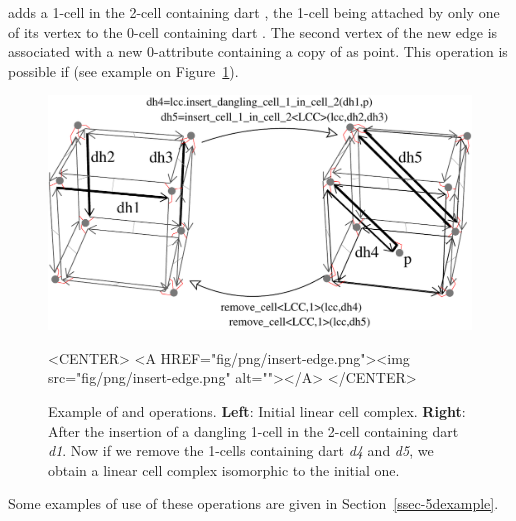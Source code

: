  adds a 1-cell in
the 2-cell containing dart , the 1-cell being attached by only
one of its vertex to the 0-cell containing dart .  The second
vertex of the new edge is associated with a new 0-attribute containing
a copy of  as point. This operation is possible if
\myin{} (see example on
Figure~\ref{fig-lcc-insert-dangling-edge}).
  \begin{figure}[htb]
    \begin{ccTexOnly}
      \begin{center}
        \includegraphics[width=.72\textwidth]{Linear_cell_complex/fig/pdf/insert-edge}
      \end{center}
    \end{ccTexOnly}
    \begin{ccHtmlOnly}
      <CENTER> <A HREF="fig/png/insert-edge.png"><img
      src="fig/png/insert-edge.png" alt=""></A> </CENTER>
    \end{ccHtmlOnly}
    \caption{Example of  and
       operations. \textbf{Left}: Initial linear
      cell complex.  \textbf{Right}: After the insertion of a dangling
      1-cell in the 2-cell containing dart \emph{d1}. Now if we remove
      the 1-cells containing dart \emph{d4} and \emph{d5},
      we obtain a linear cell complex isomorphic to the initial one.}
    \label{fig-lcc-insert-dangling-edge}
  \end{figure}

  Some examples of use of these operations are given in
  Section~\ref{ssec-5dexample}.


